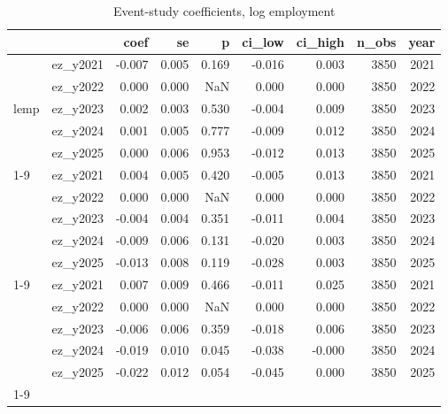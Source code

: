 \begin{table}
\caption{Event-study coefficients, log employment}
\label{tab:table_s2_event_study_employment}
\begin{tabular}{llrrrrrrr}
\toprule
 &  & coef & se & p & ci\_low & ci\_high & n\_obs & year \\
\midrule
\multirow[t]{5}{*}{lemp} & ez\_y2021 & -0.007 & 0.005 & 0.169 & -0.016 & 0.003 & 3850 & 2021 \\
 & ez\_y2022 & 0.000 & 0.000 & NaN & 0.000 & 0.000 & 3850 & 2022 \\
 & ez\_y2023 & 0.002 & 0.003 & 0.530 & -0.004 & 0.009 & 3850 & 2023 \\
 & ez\_y2024 & 0.001 & 0.005 & 0.777 & -0.009 & 0.012 & 3850 & 2024 \\
 & ez\_y2025 & 0.000 & 0.006 & 0.953 & -0.012 & 0.013 & 3850 & 2025 \\
\cline{1-9}
\multirow[t]{5}{*}{lemp\_w} & ez\_y2021 & 0.004 & 0.005 & 0.420 & -0.005 & 0.013 & 3850 & 2021 \\
 & ez\_y2022 & 0.000 & 0.000 & NaN & 0.000 & 0.000 & 3850 & 2022 \\
 & ez\_y2023 & -0.004 & 0.004 & 0.351 & -0.011 & 0.004 & 3850 & 2023 \\
 & ez\_y2024 & -0.009 & 0.006 & 0.131 & -0.020 & 0.003 & 3850 & 2024 \\
 & ez\_y2025 & -0.013 & 0.008 & 0.119 & -0.028 & 0.003 & 3850 & 2025 \\
\cline{1-9}
\multirow[t]{5}{*}{lemp\_major} & ez\_y2021 & 0.007 & 0.009 & 0.466 & -0.011 & 0.025 & 3850 & 2021 \\
 & ez\_y2022 & 0.000 & 0.000 & NaN & 0.000 & 0.000 & 3850 & 2022 \\
 & ez\_y2023 & -0.006 & 0.006 & 0.359 & -0.018 & 0.006 & 3850 & 2023 \\
 & ez\_y2024 & -0.019 & 0.010 & 0.045 & -0.038 & -0.000 & 3850 & 2024 \\
 & ez\_y2025 & -0.022 & 0.012 & 0.054 & -0.045 & 0.000 & 3850 & 2025 \\
\cline{1-9}
\bottomrule
\end{tabular}
\end{table}
